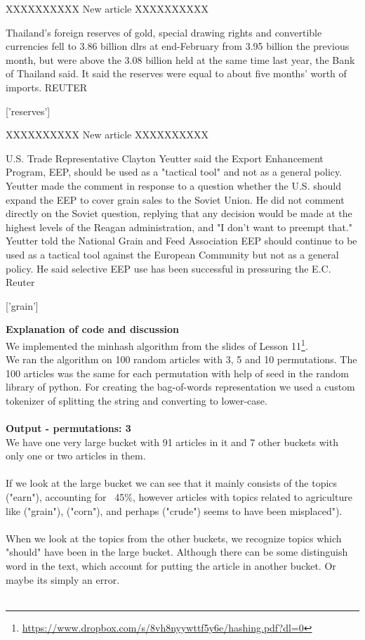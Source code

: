 \documentclass{article}
\begin{document}
\begin{pythonOutput}
['acq']

XXXXXXXXXX
New article
XXXXXXXXXX

Thailand's foreign reserves of gold,
special drawing rights and convertible currencies fell to 3.86
billion dlrs at end-February from 3.95 billion the previous
month, but were above the 3.08 billion held at the same time
last year, the Bank of Thailand said.
    It said the reserves were equal to about five months' worth
of imports.
 REUTER

['reserves']

XXXXXXXXXX
New article
XXXXXXXXXX

U.S. Trade Representative Clayton
Yeutter said the Export Enhancement Program, EEP, should be
used as a "tactical tool" and not as a general policy.
    Yeutter made the comment in response to a question whether
the U.S. should expand the EEP to cover grain sales to the
Soviet Union.
    He did not comment directly on the Soviet question,
replying that any decision would be made at the highest levels
of the Reagan administration, and "I don't want to preempt that."
    Yeutter told the National Grain and Feed Association EEP
should continue to be used as a tactical tool against the
European Community but not as a general policy. He said
selective EEP use has been successful in pressuring the E.C.
 Reuter

['grain']


\end{pythonOutput}
\textbf{Explanation of code and discussion}\\
We implemented the minhash algorithm from the slides of Lesson 11\footnote{\url{https://www.dropbox.com/s/8vh8nyywttf5y6e/hashing.pdf?dl=0}}.\\
We ran the algorithm on 100 random articles with 3, 5 and 10 permutations. The 100 articles was the same for each permutation with help of seed in the random library of python. For creating the bag-of-words representation we used a custom tokenizer of splitting the string and converting to lower-case.\\
~\\
\textbf{Output - permutations: 3}\\
We have one very large bucket with 91 articles in it and 7 other buckets with only one or two articles in them.\\
~\\
If we look at the large bucket we can see that it mainly consists of the topics ("earn"), accounting for ~45\%, however articles with topics related to agriculture like ("grain"), ("corn"), and perhaps ("crude") seems to have been misplaced").\\
~\\
When we look at the topics from the other buckets, we recognize topics which "should" have been in the large bucket. Although there can be some distinguish word in the text, which account for putting the article in another bucket. Or maybe its simply an error. \\
~\\
\end{document}
